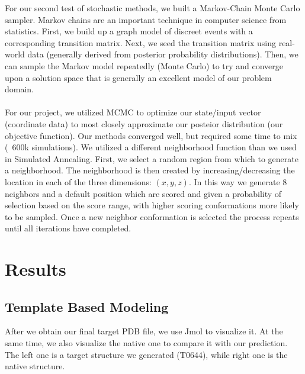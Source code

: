 \documentclass{article}
\begin{document}
For our second test of stochastic methods, we built a Markov-Chain Monte Carlo sampler.  Markov chains are an important technique in computer science from statistics.  First, we build up a graph model of discreet events with a corresponding transition matrix.  Next, we seed the transition matrix using real-world data (generally derived from posterior probability distributions).  Then, we can sample the Markov model repeatedly (Monte Carlo) to try and converge upon a solution space that is generally an excellent model of our problem domain.\\\\
For our project, we utilized MCMC to optimize our state/input vector (coordinate data) to most closely approximate our posteior distribution (our objective function).  Our methods converged well, but required some time to mix (~600k simulations).  We utilized a different neighborhood function than we used in Simulated Annealing.  First, we select a random region from which to generate a neighborhood. The neighborhood is then created by increasing/decreasing the location in each of the three dimensions: $(x, y, z)$. In this way we generate 8 neighbors and a default position which are scored and given a probability of selection based on the score range, with higher scoring conformations more likely to be sampled. Once a new neighbor conformation is selected the process repeats until all iterations have completed.


\section{Results}

\subsection{Template Based Modeling}

After we obtain our final target PDB file, we use Jmol to visualize it. At the same time, we also visualize the native one to compare it with our prediction. The left one is a target structure we generated (T0644), while right one is the native structure.\\\\


\end{document}
